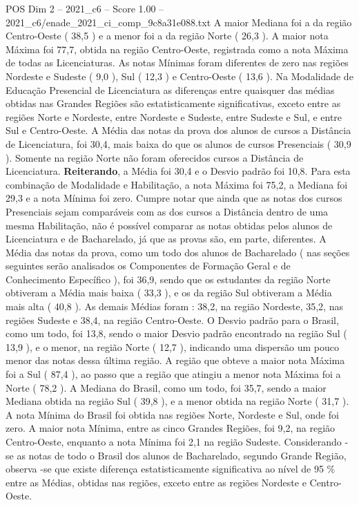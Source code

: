 \begin{textsample}{POS Dim 2 – 2021\_c6 – Score 1.00 – 2021\_c6/enade\_2021\_ci\_comp\_9c8a31e088.txt}
A maior Mediana foi a da região Centro-Oeste ( 38,5 ) e a menor foi a da região Norte ( 26,3 ).
A maior nota Máxima foi 77,7, obtida na região Centro-Oeste, registrada como a nota Máxima de todas as Licenciaturas.
As notas Mínimas foram diferentes de zero nas regiões Nordeste e Sudeste ( 9,0 ), Sul ( 12,3 ) e Centro-Oeste ( 13,6 ).
Na Modalidade de Educação Presencial de Licenciatura as diferenças entre quaisquer das médias obtidas nas Grandes Regiões são estatisticamente significativas, exceto entre as regiões Norte e Nordeste, entre Nordeste e Sudeste, entre Sudeste e Sul, e entre Sul e Centro-Oeste.
A Média das notas da prova dos alunos de cursos a Distância de Licenciatura, foi 30,4, mais baixa do que os alunos de cursos Presenciais ( 30,9 ).
Somente na região Norte não foram oferecidos cursos a Distância de Licenciatura. \textbf{Reiterando}, a Média foi 30,4 e o Desvio padrão foi 10,8.
Para esta combinação de Modalidade e Habilitação, a nota Máxima foi 75,2, a Mediana foi 29,3 e a nota Mínima foi zero.
Cumpre notar que ainda que as notas dos cursos Presenciais sejam comparáveis com as dos cursos a Distância dentro de uma mesma Habilitação, não é possível comparar as notas obtidas pelos alunos de Licenciatura e de Bacharelado, já que as provas são, em parte, diferentes.
A Média das notas da prova, como um todo dos alunos de Bacharelado ( nas seções seguintes serão analisados os Componentes de Formação Geral e de Conhecimento Específico ), foi 36,9, sendo que os estudantes da região Norte obtiveram a Média mais baixa ( 33,3 ), e os da região Sul obtiveram a Média mais alta ( 40,8 ).
As demais Médias foram : 38,2, na região Nordeste, 35,2, nas regiões Sudeste e 38,4, na região Centro-Oeste.
O Desvio padrão para o Brasil, como um todo, foi 13,8, sendo o maior Desvio padrão encontrado na região Sul ( 13,9 ), e o menor, na região Norte ( 12,7 ), indicando uma dispersão um pouco menor das notas dessa última região.
A região que obteve a maior nota Máxima foi a Sul ( 87,4 ), ao passo que a região que atingiu a menor nota Máxima foi a Norte ( 78,2 ).
A Mediana do Brasil, como um todo, foi 35,7, sendo a maior Mediana obtida na região Sul ( 39,8 ), e a menor obtida na região Norte ( 31,7 ).
A nota Mínima do Brasil foi obtida nas regiões Norte, Nordeste e Sul, onde foi zero.
A maior nota Mínima, entre as cinco Grandes Regiões, foi 9,2, na região Centro-Oeste, enquanto a nota Mínima foi 2,1 na região Sudeste.
Considerando -se as notas de todo o Brasil dos alunos de Bacharelado, segundo Grande Região, observa -se que existe diferença estatisticamente significativa ao nível de 95 \% entre as Médias, obtidas nas regiões, exceto entre as regiões Nordeste e Centro-Oeste.

\end{textsample}
